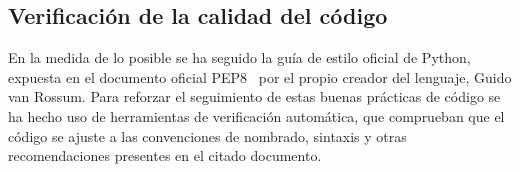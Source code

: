 \subsection{Verificación de la calidad del código}

En la medida de lo posible se ha seguido la guía de estilo oficial de Python,
expuesta en el documento oficial PEP8~\cite{pep8} por el propio creador del
lenguaje, Guido van Rossum. Para reforzar el seguimiento de estas buenas
prácticas de código se ha hecho uso de herramientas de verificación automática,
que comprueban que el código se ajuste a las convenciones de nombrado, sintaxis
y otras recomendaciones presentes en el citado documento.




